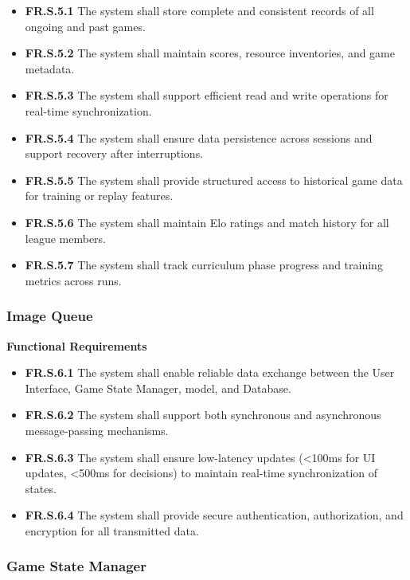 \documentclass{article}
\begin{document}
\begin{itemize}
  \item \label{FR.S.5.1}\textbf{FR.S.5.1} The system shall store complete and consistent records of all ongoing and past \emph{\Catan{}} games.
  \item \label{FR.S.5.2}\textbf{FR.S.5.2} The system shall maintain scores, resource inventories, and game metadata.
  \item \label{FR.S.5.3}\textbf{FR.S.5.3} The system shall support efficient read and write operations for real-time synchronization.
  \item \label{FR.S.5.4}\textbf{FR.S.5.4} The system shall ensure data persistence across sessions and support recovery after interruptions.
  \item \label{FR.S.5.5}\textbf{FR.S.5.5} The system shall provide structured access to historical game data for training or replay features.
  \item \label{FR.S.5.6}\textbf{FR.S.5.6} The system shall maintain Elo ratings and match history for all league members.
  \item \label{FR.S.5.7}\textbf{FR.S.5.7} The system shall track curriculum phase progress and training metrics across runs.
\end{itemize}


\subsubsection{Image Queue}

\textbf{Functional Requirements}

\begin{itemize}
  \item \label{FR.S.6.1}\textbf{FR.S.6.1} The system shall enable reliable data exchange between the User Interface, Game State Manager, \AI{} model, and Database.
  \item \label{FR.S.6.2}\textbf{FR.S.6.2} The system shall support both synchronous and asynchronous message-passing mechanisms.
  \item \label{FR.S.6.3}\textbf{FR.S.6.3} The system shall ensure low-latency updates (<100ms for UI updates, <500ms for \AI{} decisions) to maintain real-time synchronization of states.
  \item \label{FR.S.6.4}\textbf{FR.S.6.4} The system shall provide secure authentication, authorization, and encryption for all transmitted data.
\end{itemize}

\subsubsection{Game State Manager}
\end{document}
